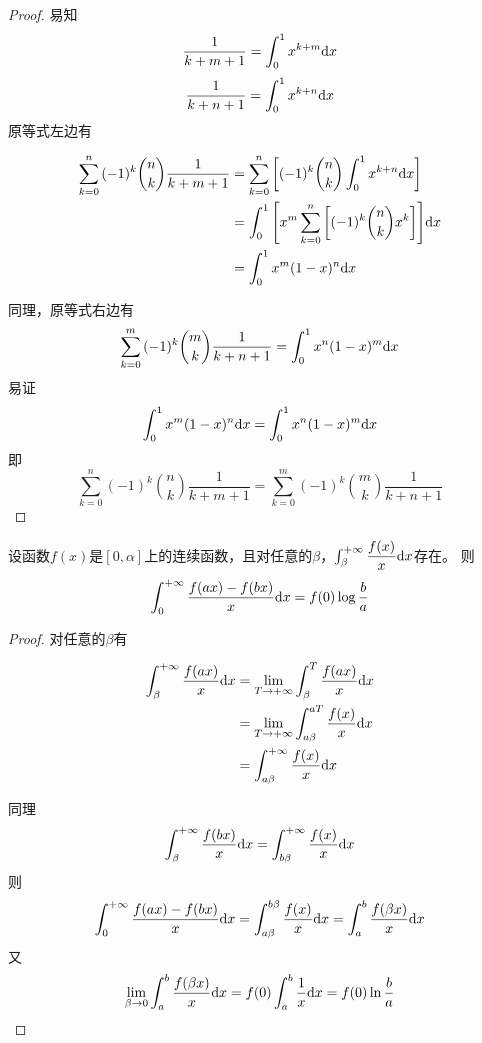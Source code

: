 \begin{proof}

    易知
    \[\dfrac{1}{k + m + 1} = \int_{0}^{1}{x^{k + m}}\mathrm{d} x\]
    \[\dfrac{1}{k + n + 1} = \int_{0}^{1}{x^{k + n}}\mathrm{d} x\]
    原等式左边有
    
    \begin{align*}
        \sum\limits_{k = 0}^{n}{(-1)^k \binom{n}{k}\dfrac{1}{k + m + 1}} & =  \sum\limits_{k = 0}^{n}{\left[ (-1)^k \binom{n}{k} \int_{0}^{1}{x^{k + n}}\mathrm{d} x \right]} \\
        & = \int_{0}^{1}{\left[ x^m \sum\limits_{k = 0}^{n}{\left[ (-1)^k\binom{n}{k} x^k \right]} \right]}\mathrm{d} x \\
        & = \int_{0}^{1}{x^m (1 - x)^n}\mathrm{d} x        
    \end{align*}

    同理，原等式右边有
    \[\sum\limits_{k = 0}^{m}{(-1)^k \binom{m}{k}\dfrac{1}{k + n + 1}} = \int_{0}^{1}{x^n (1 - x)^m}\mathrm{d} x\]
    易证
    \[\int_{0}^{1}{x^m (1 - x)^n}\mathrm{d} x = \int_{0}^{1}{x^n (1 - x)^m}\mathrm{d} x\]
    即
    \[\sum\limits_{k = 0}^{n}{(-1)^k \binom{n}{k}\dfrac{1}{k + m + 1}} = \sum\limits_{k = 0}^{m}{(-1)^k \binom{m}{k}\dfrac{1}{k + n + 1}}\]

\end{proof}

\begin{theorem}[Frullani定理]

    设函数$f(x)$是$[0, \alpha]$上的连续函数，且对任意的$\beta$，$\int_{\beta}^{+\infty}{\dfrac{f(x)}{x}}\mathrm{d} x$存在。
    则
    \[\int_{0}^{+\infty}{\dfrac{f(ax) - f(bx)}{x}}\mathrm{d} x = f(0)\log{\dfrac{b}{a}}\]

\end{theorem}

\begin{proof}

    对任意的$\beta$有
    
    \begin{align*}
        \int_{\beta}^{+\infty}{\dfrac{f(ax)}{{x}}}\mathrm{d} x & = \lim\limits_{T \to +\infty}{\int_{\beta}^{T}{\dfrac{f(ax)}{{x}}}\mathrm{d} x} \\
        & = \lim\limits_{T \to +\infty}{\int_{a\beta}^{aT}{\dfrac{f(x)}{x}}\mathrm{d} x} \\
        & = \int_{a\beta}^{+\infty}{\dfrac{f(x)}{x}}\mathrm{d} x
    \end{align*}

    同理
    \[\int_{\beta}^{+\infty}{\dfrac{f(bx)}{{x}}}\mathrm{d} x = \int_{b\beta}^{+\infty}{\dfrac{f(x)}{x}}\mathrm{d} x\]
    则
    \[\int_{0}^{+\infty}{\dfrac{f(ax) - f(bx)}{x}}\mathrm{d} x = \int_{a\beta}^{b\beta}{\dfrac{f(x)}{x}}\mathrm{d} x = \int_{a}^{b}{\dfrac{f(\beta x)}{x}}\mathrm{d} x\]
    又
    \[\lim\limits_{\beta \to 0}{\int_{a}^{b}{\dfrac{f(\beta x)}{x}}\mathrm{d} x} = f(0) \int_{a}^{b}{\dfrac{1}{x}}\mathrm{d} x = f(0)\ln{\dfrac{b}{a}}\]
    
\end{proof}

